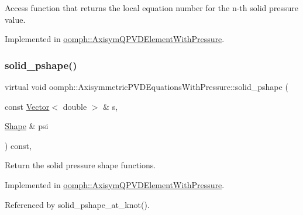 Access function that returns the local equation number for the n-\/th solid pressure value. 

Implemented in \hyperlink{classoomph_1_1AxisymQPVDElementWithPressure_a8c9fa9511418570fab627362609235d0}{oomph\+::\+Axisym\+Q\+P\+V\+D\+Element\+With\+Pressure}.

\mbox{\label{classoomph_1_1AxisymmetricPVDEquationsWithPressure_ab93f05b37f8bee3a8f390e33cbcd3a6e}} 
\subsubsection{\texorpdfstring{solid\+\_\+pshape()}{solid\_pshape()}}
{\footnotesize\ttfamily virtual void oomph\+::\+Axisymmetric\+P\+V\+D\+Equations\+With\+Pressure\+::solid\+\_\+pshape (\begin{DoxyParamCaption}\item[{const \hyperlink{classoomph_1_1Vector}{Vector}$<$ double $>$ \&}]{s,  }\item[{\hyperlink{classoomph_1_1Shape}{Shape} \&}]{psi }\end{DoxyParamCaption}) const\hspace{0.3cm}{\ttfamily [protected]}, {}}



Return the solid pressure shape functions. 



Implemented in \hyperlink{classoomph_1_1AxisymQPVDElementWithPressure_acc96f08aadc9568d283dbe09ce06d643}{oomph\+::\+Axisym\+Q\+P\+V\+D\+Element\+With\+Pressure}.



Referenced by solid\+\_\+pshape\+\_\+at\+\_\+knot().

\mbox{\label{classoomph_1_1AxisymmetricPVDEquationsWithPressure_a2c423c3bfbc0debcf041f11fc24d1510}} 
